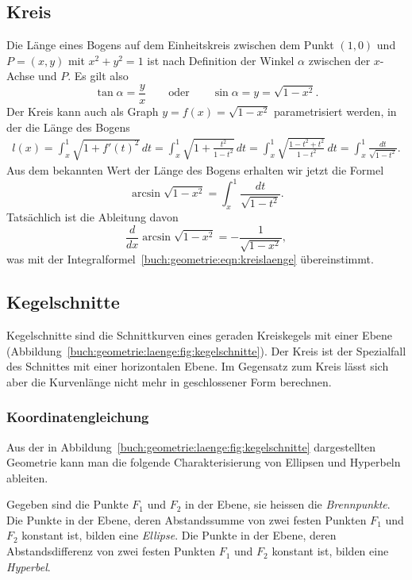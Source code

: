 \subsection{Kreis}
Die Länge eines Bogens auf dem Einheitskreis zwischen dem Punkt
$(1,0)$ und $P=(x,y)$ mit $x^2+y^2=1$ ist nach Definition der
Winkel $\alpha$ zwischen der $x$-Achse und $P$.
Es gilt also
\[
\tan\alpha = \frac{y}{x}
\qquad\text{oder}\qquad
\sin\alpha = y = \sqrt{1-x^2}.
\]
Der Kreis kann auch als Graph $y=f(x)=\sqrt{1-x^2}$ parametrisiert werden,
in der die Länge des Bogens 
\begin{align*}
l(x)
=
\int_x^1 \sqrt{1+f'(t)^2}\,dt
=
\int_x^1 \sqrt{1+\frac{t^2}{1-t^2}}\,dt
=
\int_x^1 \sqrt{\frac{1-t^2+t^2}{1-t^2}}\,dt
=
\int_x^1 \frac{dt}{\sqrt{1-t^2}}.
\end{align*}
Aus dem bekannten Wert der Länge des Bogens erhalten wir jetzt die
Formel
\begin{equation}
\arcsin \sqrt{1-x^2} = \int_x^1 \frac{dt}{\sqrt{1-t^2}}.
\label{buch:geometrie:eqn:kreislaenge} 
\end{equation}
Tatsächlich ist die Ableitung davon
\[
\frac{d}{dx}\arcsin\sqrt{1-x^2}
=
-\frac{1}{\sqrt{1-x^2}},
\]
was mit der Integralformel~\ref{buch:geometrie:eqn:kreislaenge} 
übereinstimmt.

\subsection{Kegelschnitte
\label{buch:geometrie:subsection:kegelschnitte}}
Kegelschnitte sind die Schnittkurven eines geraden Kreiskegels
mit einer Ebene (Abbildung~\ref{buch:geometrie:laenge:fig:kegelschnitte}).
Der Kreis ist der Spezialfall des Schnittes mit einer horizontalen
Ebene.
Im Gegensatz zum Kreis lässt sich aber die Kurvenlänge nicht mehr
in geschlossener Form berechnen.

\subsubsection{Koordinatengleichung}
Aus der in Abbildung~\ref{buch:geometrie:laenge:fig:kegelschnitte}
dargestellten Geometrie kann man die folgende Charakterisierung von
Ellipsen und Hyperbeln ableiten.

\begin{definition}
\label{buch:geometrie:def:kegelschnitte}
Gegeben sind die Punkte $F_1$ und $F_2$ in der Ebene, sie heissen
die {\em Brennpunkte}.
Die Punkte in der Ebene, deren Abstandssumme von zwei festen Punkten $F_1$
und $F_2$ konstant ist, bilden eine {\em Ellipse}.
Die Punkte in der Ebene, deren Abstandsdifferenz von zwei festen Punkten
$F_1$ und $F_2$ konstant ist, bilden eine {\em Hyperbel}.
\end{definition}

